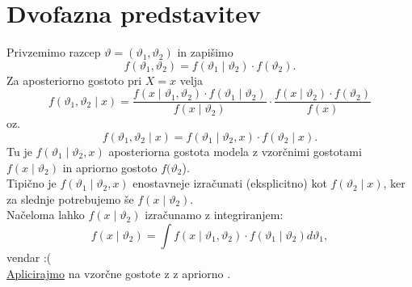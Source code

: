 \documentclass[a4paper, 12pt]{book}
\theoremstyle{definition}
\theoremstyle{remark}
\begin{document}
\section{Dvofazna predstavitev}

Privzemimo razcep $\vartheta = (\vartheta_1, \vartheta_2)$ in zapišimo
\begin{equation*}
  f(\vartheta_1, \vartheta_2) = f(\vartheta_1 \mid \vartheta_2) \cdot f(\vartheta_2).
\end{equation*}
Za aposteriorno gostoto pri $X = x$ velja
\begin{equation*}
  f(\vartheta_1, \vartheta_2 \mid x) = \frac{f(x \mid \vartheta_1, \vartheta_2) \cdot f(\vartheta_1 \mid \vartheta_2)}{f(x \mid \vartheta_2)}
    \cdot \frac{f(x \mid \vartheta_2) \cdot f(\vartheta_2)}{f(x)}
\end{equation*}
oz.
\begin{equation*}
  f(\vartheta_1, \vartheta_2 \mid x) = f(\vartheta_1 \mid \vartheta_2, x) \cdot f(\vartheta_2 \mid x).
\end{equation*}
Tu je $f(\vartheta_1 \mid \vartheta_2, x)$ aposteriorna gostota modela z vzorčnimi gostotami $f(x \mid \vartheta_2)$
in apriorno gostoto $f(\vartheta_2$). \\
Tipično je $f(\vartheta_1 \mid \vartheta_2, x)$ enostavneje izračunati (eksplicitno) kot $f(\vartheta_2 \mid x)$,
ker za slednje potrebujemo še $f(x \mid \vartheta_2)$. \\
Načeloma lahko $f(x \mid \vartheta_2)$ izračunamo z integriranjem:
\begin{equation*}
  f(x \mid \vartheta_2) = \int f(x \mid \vartheta_1, \vartheta_2) \cdot f(\vartheta_1 \mid \vartheta_2) d\vartheta_1,
\end{equation*}
vendar :( \\
\underline{Aplicirajmo} na vzorčne gostote z  z apriorno .
\end{document}
